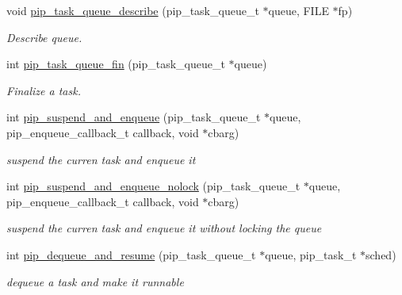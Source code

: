 \begin{DoxyCompactItemize}
\item 
void \hyperlink{group__libpip_ga7fdea4628abd0c38779276b6cd8ebd3f}{pip\-\_\-task\-\_\-queue\-\_\-describe} (pip\-\_\-task\-\_\-queue\-\_\-t $\ast$queue, F\-I\-L\-E $\ast$fp)
\begin{DoxyCompactList}\small\item\em Describe queue. \end{DoxyCompactList}\end{DoxyCompactItemize}
\begin{DoxyCompactItemize}
\item 
int \hyperlink{group__libpip_ga45d0eaa7122e459ea19187c148b9da10}{pip\-\_\-task\-\_\-queue\-\_\-fin} (pip\-\_\-task\-\_\-queue\-\_\-t $\ast$queue)
\begin{DoxyCompactList}\small\item\em Finalize a task. \end{DoxyCompactList}\end{DoxyCompactItemize}
\begin{DoxyCompactItemize}
\item 
int \hyperlink{group__libpip_ga7dbf7e64e78cd00ef62c3bb04f289a68}{pip\-\_\-suspend\-\_\-and\-\_\-enqueue} (pip\-\_\-task\-\_\-queue\-\_\-t $\ast$queue, pip\-\_\-enqueue\-\_\-callback\-\_\-t callback, void $\ast$cbarg)
\begin{DoxyCompactList}\small\item\em suspend the curren task and enqueue it \end{DoxyCompactList}\end{DoxyCompactItemize}
\begin{DoxyCompactItemize}
\item 
int \hyperlink{group__libpip_gab78d289ab89fa2981f2910849b1b2df7}{pip\-\_\-suspend\-\_\-and\-\_\-enqueue\-\_\-nolock} (pip\-\_\-task\-\_\-queue\-\_\-t $\ast$queue, pip\-\_\-enqueue\-\_\-callback\-\_\-t callback, void $\ast$cbarg)
\begin{DoxyCompactList}\small\item\em suspend the curren task and enqueue it without locking the queue \end{DoxyCompactList}\end{DoxyCompactItemize}
\begin{DoxyCompactItemize}
\item 
int \hyperlink{group__libpip_gaaff299f195e2397f17cf11016c8a394f}{pip\-\_\-dequeue\-\_\-and\-\_\-resume} (pip\-\_\-task\-\_\-queue\-\_\-t $\ast$queue, pip\-\_\-task\-\_\-t $\ast$sched)
\begin{DoxyCompactList}\small\item\em dequeue a task and make it runnable \end{DoxyCompactList}\end{DoxyCompactItemize}
